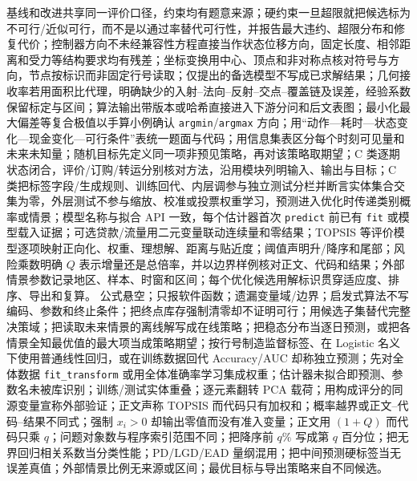 \documentclass[withoutpreface,bwprint]{cumcmthesis}
\newif\ifmcmguidance
\begin{document}
  {基线和改进共享同一评价口径，约束均有题意来源；硬约束一旦超限就把候选标为不可行/近似可行，而不是以通过率替代可行性，并报告最大违约、超限分布和修复代价；控制器方向不未经兼容性方程直接当作状态位移方向，固定长度、相邻距离和受力等结构要求均有残差；坐标变换用中心、顶点和非对称点核对符号与方向，节点按标识而非固定行号读取；仅提出的备选模型不写成已求解结果；几何接收率若用面积比代理，明确缺少的入射--法向--反射--交点--覆盖链及误差，经验系数保留标定与区间；算法输出带版本或哈希直接进入下游分问和后文表图；最小化最大偏差等复合极值以手算小例确认 \texttt{argmin}/\texttt{argmax} 方向；用“动作—耗时—状态变化—现金变化—可行条件”表统一题面与代码；用信息集表区分每个时刻可见量和未来未知量；随机目标先定义同一项非预见策略，再对该策略取期望；C 类逐期状态闭合，评价/订购/转运分别核对方法，沿用模块列明输入、输出与目标；C 类把标签字段/生成规则、训练回代、内层调参与独立测试分栏并断言实体集合交集为零，外层测试不参与缩放、校准或投票权重学习，预测进入优化时传递类别概率或情景；模型名称与拟合 API 一致，每个估计器首次 \texttt{predict} 前已有 \texttt{fit} 或模型载入证据；可选贷款/流量用二元变量联动连续量和零结果；TOPSIS 等评价模型逐项映射正向化、权重、理想解、距离与贴近度；阈值声明升/降序和尾部；风险乘数明确 $Q$ 表示增量还是总倍率，并以边界样例核对正文、代码和结果；外部情景参数记录地区、样本、时窗和区间；每个优化候选用解标识贯穿适应度、排序、导出和复算。}
  {公式悬空；只报软件函数；遗漏变量域/边界；启发式算法不写编码、参数和终止条件；把终点库存强制清零却不证明可行；用候选子集替代完整决策域；把读取未来情景的离线解写成在线策略；把稳态分布当逐日预测，或把各情景全知最优值的最大项当成策略期望；按行号制造监督标签、在 Logistic 名义下使用普通线性回归，或在训练数据回代 Accuracy/AUC 却称独立预测；先对全体数据 \texttt{fit\_transform} 或用全体准确率学习集成权重；估计器未拟合即预测、参数名未被库识别；训练/测试实体重叠；逐元素翻转 PCA 载荷；用构成评分的同源变量宣称外部验证；正文声称 TOPSIS 而代码只有加权和；概率越界或正文--代码--结果不同式；强制 $x_i>0$ 却输出零值而没有准入变量；正文用 $(1+Q)$ 而代码只乘 $q$；问题对象数与程序索引范围不同；把降序前 $q\%$ 写成第 $q$ 百分位；把无界回归相关系数当分类性能；PD/LGD/EAD 量纲混用；把中间预测硬标签当无误差真值；外部情景比例无来源或区间；最优目标与导出策略来自不同候选。}

\ifmcmguidance
  \begin{quote}\small
  \textbf{A0175 型求解补充：}遮挡、阴影与截断按先后条件分支推进，并明确某条件成立后哪些计算不再执行；邻接筛选先报告全配对负担，再以局部相互作用和距离阈值压缩候选。计算预算写成“低比例、多次重复的粗评估—较高比例、较少重复的细复算”；基线扫描证实影响弱的变量先冻结，把预算留给位置、间距或尺寸等主要变量。
  \end{quote}
\fi
\end{document}
